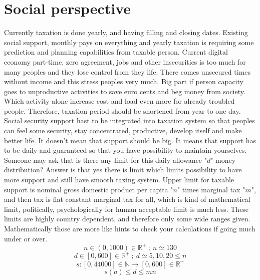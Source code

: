 \section{Social perspective}
\label{social_perspective}
Currently taxation is done yearly, and having filling and closing dates. Existing social support,
monthly pays on everything and yearly taxation is requiring some prediction and planning capabilities from taxable person.
Current digital economy part-time, zero agreement, jobs and other insecurities
is too much for many peoples and they lose control from they life.
There comes unsecured times without income and this stress peoples very much.
Big part if person capacity goes to unproductive activities to save euro cents and beg money from society.
Which activity alone increase cost and load even more for already troubled people.
Therefore, taxation period should be shortened from year to one day.
Social security support hast to be integrated into taxation system
so that peoples can feel some security, stay concentrated, productive,
develop itself and make better life.
It doesn't mean that support should be big.
It means that support has to be daily and guaranteed so that you have possibility to maintain yourselves.
Someone may ask that is there any limit for this daily allowance "$d$" money distribution?
Answer is that yes there is limit which limits possibility to have more support and still have smooth taxing system.
Upper limit for taxable support is nominal gross domestic product per capita "$n$" times marginal tax "$m$",
and then tax is flat constant marginal tax for all, which is kind of mathematical limit,
politically, psychologically for human acceptable limit is much less.
These limits are highly country dependent, and therefore only some wide ranges given.
Mathematically those are more like hints to check your calculations if going much under or over.
\begin{equation} \label{eq:const_n}
n \in (0,1000) \in \mathbb{R}^+
~;~ n \simeq 130
\end{equation}
\begin{equation} \label{eq:const_d}
d \in [0,600] \in \mathbb{R}^+
~;~ d \simeq 5, 10, 20 \leq n
\end{equation}
\begin{equation} \label{eq:const_s}
s: [0,44000]\in\mathbb{N} \rightarrow [0,600] \in \mathbb{R}^+
\end{equation}
\begin{equation} \label{eq:sup_s}
s(a)\leq d \leq mn
\end{equation}
